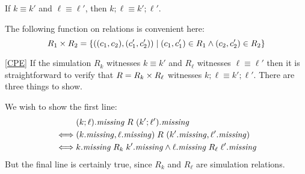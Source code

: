 \begin{defn}[$R$-similarity]
\begin{theorem}
\begin{lemma}\label{CPE}
If $k \equiv k'$ and $\ell \equiv \ell'$, then $k;\ell \equiv k';\ell'$.
\end{lemma}

\begin{definition}
The following function on relations is convenient here:
\[R_1 \times R_2 = \{((c_1,c_2),(c_1',c_2'))\;|\;(c_1,c_1') \in R_1 \land
(c_2,c_2') \in R_2\}\]
\end{definition}

\begin{pfof}{\ref{CPE}}
  If the simulation $R_k$ witnesses $k\equiv k'$ and $R_\ell$ witnesses
  $\ell\equiv \ell'$ then it is straightforward to verify that $R = R_k
  \times R_\ell$ witnesses $k;\ell \equiv k';\ell'$. There are three
  things to show.

  \begin{longenum}
      \item We wish to show the first line:
          \begin{align*}
                  &(k; \ell).\mathit{missing}\mathrel{R_{}}(k'; \ell').\mathit{missing} \\
              \iff&(k.\mathit{missing}, \ell.\mathit{missing})\mathrel{R_{}}(k'.\mathit{missing},\ell'.\mathit{missing}) \\
              \iff&k.\mathit{missing} \mathrel{R_{k}} k'.\mathit{missing}\land\ell.\mathit{missing}\mathrel{R_{\ell}}\ell'.\mathit{missing}
          \end{align*}
          But the final line is certainly true, since $R_k$ and $R_\ell$ are
          simulation relations.


\end{longenum}
\end{pfof}
\end{theorem}
\end{defn}
